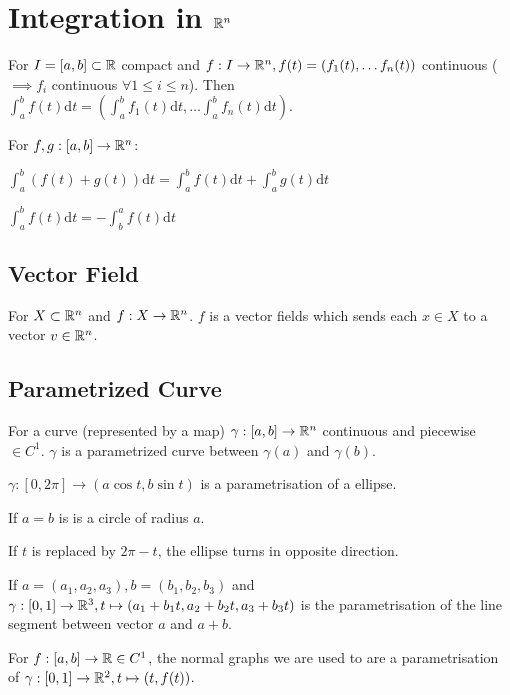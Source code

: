 
\section{Integration in $\mathbb{R}^n$}
For $I = [a, b] \subset \mathbb{R}$ compact and $f:I \to \mathbb{R}^n, f(t) = (f_1(t), \dots f_n(t))$ continuous ($\implies f_i$ continuous $\forall 1 \le i \le n$). Then $\int_{a}^{b} f(t) \mathrm{d}t = (\int_{a}^{b} f_1(t) \mathrm{d}t, \dots \int_{a}^{b} f_n(t) \mathrm{d}t)$.

For $f,g: [a, b] \to \mathbb{R}^n$:
\begin{compactitem}
    \item $\int_{a}^{b} (f(t) + g(t)) \mathrm{d}t = \int_{a}^{b} f(t) \mathrm{d}t + \int_{a}^{b} g(t) \mathrm{d}t$
    \item $\int_{a}^{b} f(t) \mathrm{d}t = - \int_{b}^{a} f(t) \mathrm{d}t$
\end{compactitem}

\subsection{Vector Field}
For $X \subset \mathbb{R}^n$ and $f: X \to \mathbb{R}^n$. $f$ is a vector fields which sends each $x \in X$ to a vector $v \in \mathbb{R}^n$.

 \subsection{Parametrized Curve}
 For a curve (represented by a map) $\gamma: [a, b] \to \mathbb{R}^n$ continuous and piecewise $\in C^1$. $\gamma$ is a parametrized curve between $\gamma(a)$ and $\gamma(b)$.

 \begin{compactitem}
     \item $\gamma:[0, 2\pi] \to (a \cos t, b \sin t)$ is a parametrisation of a ellipse.
        \begin{compactitem}
            \item If $a = b$ is is a circle of radius $a$.
            \item If $t$ is replaced by $2 \pi - t$, the ellipse turns in opposite direction.
        \end{compactitem}
    \item If $a = (a_1, a_2, a_3), b = (b_1, b_2, b_3)$ and $\gamma: [0, 1] \to \mathbb{R}^3, t \mapsto (a_1 + b_1t, a_2 + b_2t, a_3 + b_3t)$ is the parametrisation of the line segment between vector $a$ and $a + b$.
    \item For $f: [a, b] \to \mathbb{R} \in C^1$, the normal graphs we are used to are a parametrisation of $\gamma: [0, 1] \to \mathbb{R}^2, t \mapsto (t, f(t))$.
\end{compactitem}

